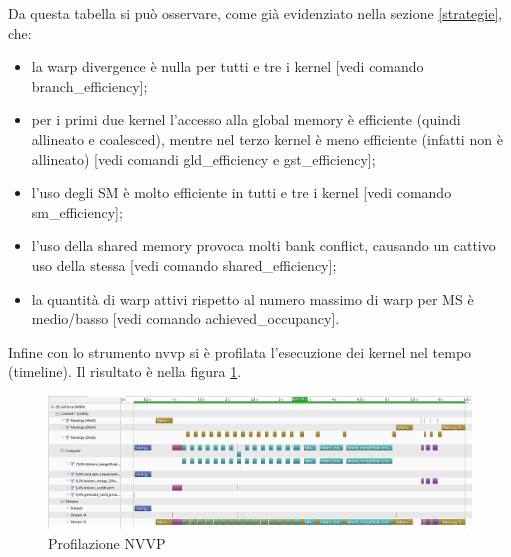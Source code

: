 \documentclass[a4paper, 11pt]{article}
\begin{document}
		Da questa tabella si può osservare, come già evidenziato nella sezione \ref{strategie}, che:
		\begin{itemize}
			\item la warp divergence è nulla per tutti e tre i kernel [vedi comando branch\_efficiency];
			\item per i primi due kernel l'accesso alla global memory è efficiente (quindi allineato e coalesced), 
				mentre nel terzo kernel è meno efficiente (infatti non è allineato) [vedi comandi gld\_efficiency e gst\_efficiency];
			\item l'uso degli SM è molto efficiente in tutti e tre i kernel [vedi comando sm\_efficiency];
			\item l'uso della shared memory provoca molti bank conflict, causando un cattivo uso della stessa [vedi comando shared\_efficiency];
			\item la quantità di warp attivi rispetto al numero massimo di warp per MS è medio/basso [vedi comando achieved\_occupancy].
		\end{itemize}
		
		Infine con lo strumento nvvp si è profilata l'esecuzione dei kernel nel tempo (timeline). Il risultato è nella figura \ref{fig:nvvp}.
		
		\begin{figure}
			\centering
			\includegraphics[width=0.99\linewidth]{img/nvvp}
			\caption{Profilazione NVVP}
			\label{fig:nvvp}
		\end{figure}
		
\end{document}
